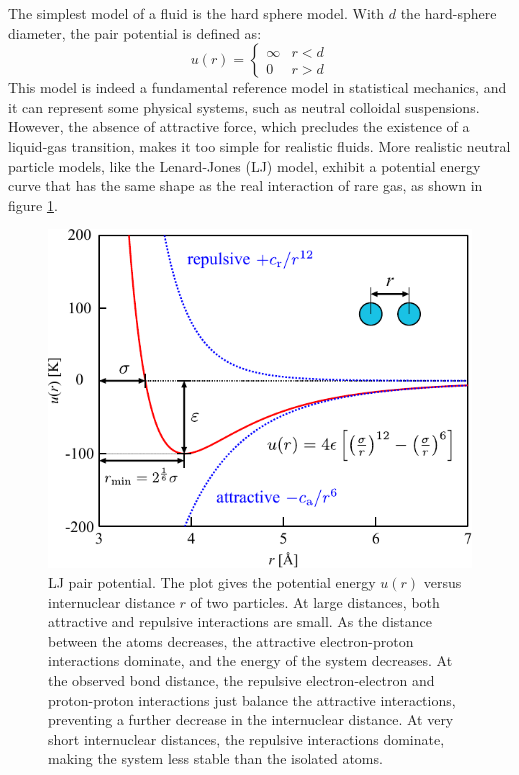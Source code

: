 The simplest model of a fluid is the hard sphere model. With $d$
the hard-sphere diameter, the pair potential is defined as:
\begin{equation}
u(r)=\begin{cases}
\infty & r<d\\
0 & r>d
\end{cases}
\end{equation}
This model is indeed a fundamental reference model in statistical
mechanics, and it can represent some physical systems, such as neutral
colloidal suspensions. However, the absence of attractive force, which
precludes the existence of a liquid-gas transition, makes it too simple
for realistic fluids. More realistic neutral particle models, like
the Lenard-Jones (LJ) model, exhibit a potential energy curve that
has the same shape as the real interaction of rare gas, as shown in
figure \ref{fig:LJ-pair-potential}.

\begin{figure}[h]
\begin{centering}
\includegraphics[scale=0.82]{_figure/lj-centre}
\par\end{centering}
\caption[LJ pair potential]{LJ pair potential. The plot gives the potential energy $u(r)$ versus
internuclear distance $r$ of two particles. At large distances, both
attractive and repulsive interactions are small. As the distance between
the atoms decreases, the attractive electron-proton interactions dominate,
and the energy of the system decreases. At the observed bond distance,
the repulsive electron-electron and proton-proton interactions just
balance the attractive interactions, preventing a further decrease
in the internuclear distance. At very short internuclear distances,
the repulsive interactions dominate, making the system less stable
than the isolated atoms.\label{fig:LJ-pair-potential}}
\end{figure}

